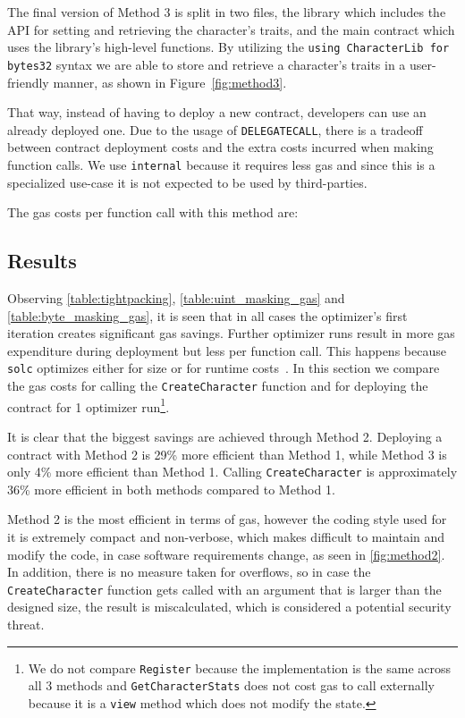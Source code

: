 The final version of Method 3 is split in two files, the library which includes the API for setting and retrieving the character's traits, and the main contract which uses the library's high-level functions. By utilizing the \texttt{using CharacterLib for bytes32} syntax we are able to store and retrieve a character's traits in a user-friendly manner, as shown in Figure~\ref{fig:method3}.


That way, instead of having to deploy a new contract, developers can use an already deployed one. Due to the usage of \texttt{DELEGATECALL}, there is a tradeoff between contract deployment costs and the extra costs incurred when making function calls. We use \texttt{internal} because it requires less gas and since this is a specialized use-case it is not expected to be used by third-parties.

The gas costs per function call with this method are: 


\subsection{Results}\label{ch:scalability:results}
Observing \ref{table:tightpacking}, \ref{table:uint_masking_gas} and \ref{table:byte_masking_gas},  it is seen that in all cases the optimizer's first iteration creates significant gas savings. Further optimizer runs result in more gas expenditure during deployment but less per function call. This happens because \texttt{solc} optimizes either for size or for runtime costs~\cite{optimizer-tradeoff}. In this section we compare the gas costs for calling the \texttt{CreateCharacter} function and for deploying the contract for 1 optimizer run\footnote{We do not compare \texttt{Register} because the implementation is the same across all 3 methods and \texttt{GetCharacterStats} does not cost gas to call externally because it is a \texttt{view} method which does not modify the state.}. 



It is clear that the biggest savings are achieved through Method 2. Deploying a contract with Method 2 is 29\% more efficient than Method 1, while Method 3 is only 4\% more efficient than Method 1. Calling \texttt{CreateCharacter} is approximately 36\% more efficient in both methods compared to Method 1. 

Method 2 is the most efficient in terms of gas, however the coding style used for it is extremely compact and non-verbose, which makes difficult to maintain and modify the code, in case software requirements change, as seen in \ref{fig:method2}. In addition, there is no measure taken for overflows, so in case the \texttt{CreateCharacter} function gets called with an argument that is larger than the designed size, the result is miscalculated, which is considered a potential security threat.

